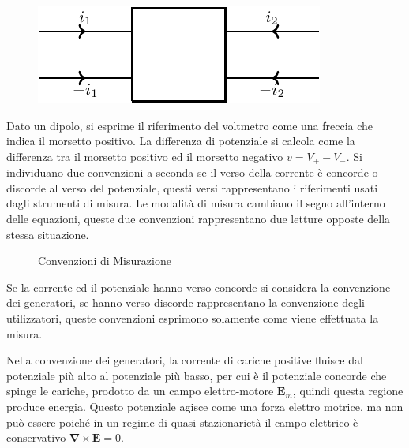 \documentclass{article}
\newcommand{\vect}[1]{\boldsymbol{\mathbf{#1}}}
\numberwithin{equation}{subsection}
\begin{document}
\begin{figure}[H]%
    \centering
    \includegraphics{due-porte.pdf}%
    \label{fig:due-porte-1}
\end{figure}

Dato un dipolo, si esprime il riferimento del voltmetro come una freccia che indica il morsetto positivo. La differenza di potenziale si calcola come la differenza tra il 
morsetto positivo ed il morsetto negativo $v=V_+-V_-$. Si individuano due convenzioni a seconda se il verso della corrente è concorde o discorde al verso del potenziale, questi 
versi rappresentano i riferimenti usati dagli strumenti di misura. Le modalità di misura cambiano il segno all'interno delle equazioni, queste due convenzioni rappresentano 
due letture opposte della stessa situazione. 

\begin{figure}[H]%
    \centering
    \qquad
    \caption{Convenzioni di Misurazione}
    \label{fig:convenzioni-misurazione}
\end{figure}

Se la corrente ed il potenziale hanno verso concorde si considera la convenzione dei generatori, se hanno verso discorde rappresentano la convenzione degli utilizzatori, 
queste convenzioni esprimono solamente come viene effettuata la misura. 


Nella convenzione dei generatori, la corrente di cariche positive fluisce dal potenziale più alto al potenziale più basso, per cui è il potenziale concorde che spinge le 
cariche, prodotto da un campo elettro-motore $\vect{E}_m$, quindi questa regione produce energia. Questo potenziale agisce come una forza elettro motrice, ma non può essere 
poiché in un regime di quasi-stazionarietà il campo elettrico è conservativo $\vect\nabla\times\vect{E}=0$. 
\end{document}
